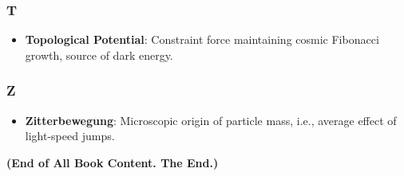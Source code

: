 \subsubsection{T}

\begin{itemize}
\item \textbf{Topological Potential}: Constraint force maintaining cosmic Fibonacci growth, source of dark energy.
\end{itemize}

\subsubsection{Z}

\begin{itemize}
\item \textbf{Zitterbewegung}: Microscopic origin of particle mass, i.e., average effect of light-speed jumps.
\end{itemize}

\textbf{(End of All Book Content. The End.)}
